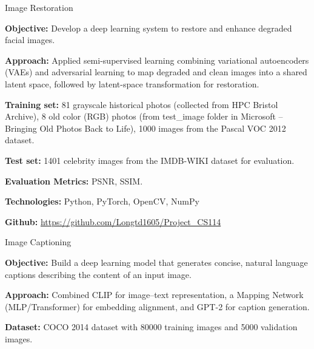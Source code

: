 

\begin{cventries}

  \cventryp
    {Image Restoration} %
    {
      \begin{cvitems}
        \item {\textbf{Objective:} Develop a deep learning system to restore and enhance degraded facial images.}
        \item {\textbf{Approach:} Applied semi-supervised learning combining variational autoencoders (VAEs) and adversarial learning to map degraded and clean images into a shared latent space, followed by latent-space transformation for restoration.}
        \item {\textbf{Training set:} 81 grayscale historical photos (collected from HPC Bristol Archive), 8 old color (RGB) photos (from test\_image folder in Microsoft – Bringing Old Photos Back to Life), 1000 images from the Pascal VOC 2012 dataset.}
        \item {\textbf{Test set:} 1401 celebrity images from the IMDB-WIKI dataset for evaluation.}
        \item {\textbf{Evaluation Metrics:} PSNR, SSIM.}
        \item {\textbf{Technologies:} Python, PyTorch, OpenCV, NumPy}
        \item {\textbf{Github:} \href{https://github.com/Longtd1605/Project_CS114}{https://github.com/Longtd1605/Project\_CS114}} %
      \end{cvitems}
      \vspace{0.5cm}
    }
  \cventryp
    {Image Captioning} %
    {
      \begin{cvitems}
        \item {\textbf{Objective:} Build a deep learning model that generates concise, natural language captions describing the content of an input image.}
        \item {\textbf{Approach:} Combined CLIP for image–text representation, a Mapping Network (MLP/Transformer) for embedding alignment, and GPT-2 for caption generation.}
        \item {\textbf{Dataset:} COCO 2014 dataset with 80000 training images and 5000 validation images.}

\end{cvitems}}
\end{cventries}

